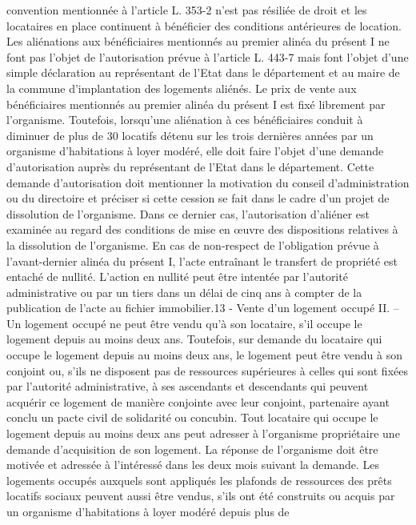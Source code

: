 \documentclass[11pt,a4paper]{report}
\begin{document}
	convention mentionnée à l'article L. 353-2 n'est pas résiliée de droit et les locataires en place continuent à
	bénéficier des conditions antérieures de location.
	Les aliénations aux bénéficiaires mentionnés au premier alinéa du présent I ne font pas l'objet de l'autorisation
	prévue à l'article L. 443-7 mais font l'objet d'une simple déclaration au représentant de l'Etat dans le
	département et au maire de la commune d'implantation des logements aliénés.
	Le prix de vente aux bénéficiaires mentionnés au premier alinéa du présent I est fixé librement par l'organisme.
	Toutefois, lorsqu'une aliénation à ces bénéficiaires conduit à diminuer de plus de 30 %
	locatifs détenu sur les trois dernières années par un organisme d'habitations à loyer modéré, elle doit faire
	l'objet d'une demande d'autorisation auprès du représentant de l'Etat dans le département. Cette demande
	d'autorisation doit mentionner la motivation du conseil d'administration ou du directoire et préciser si cette
	cession se fait dans le cadre d'un projet de dissolution de l'organisme. Dans ce dernier cas, l'autorisation
	d'aliéner est examinée au regard des conditions de mise en œuvre des dispositions relatives à la dissolution de
	l'organisme.
	En cas de non-respect de l'obligation prévue à l'avant-dernier alinéa du présent I, l'acte entraînant le transfert
	de propriété est entaché de nullité. L'action en nullité peut être intentée par l'autorité administrative ou par un
	tiers dans un délai de cinq ans à compter de la publication de l'acte au fichier immobilier.13
	- Vente d’un logement occupé
	II. – Un logement occupé ne peut être vendu qu'à son locataire, s'il occupe le logement depuis au moins deux
	ans. Toutefois, sur demande du locataire qui occupe le logement depuis au moins deux ans, le logement peut être
	vendu à son conjoint ou, s'ils ne disposent pas de ressources supérieures à celles qui sont fixées par l'autorité
	administrative, à ses ascendants et descendants qui peuvent acquérir ce logement de manière conjointe avec leur
	conjoint, partenaire ayant conclu un pacte civil de solidarité ou concubin.
	Tout locataire qui occupe le logement depuis au moins deux ans peut adresser à l'organisme propriétaire une
	demande d'acquisition de son logement. La réponse de l'organisme doit être motivée et adressée à l'intéressé
	dans les deux mois suivant la demande.
	Les logements occupés auxquels sont appliqués les plafonds de ressources des prêts locatifs sociaux peuvent
	aussi être vendus, s'ils ont été construits ou acquis par un organisme d'habitations à loyer modéré depuis plus de
\end{document}

